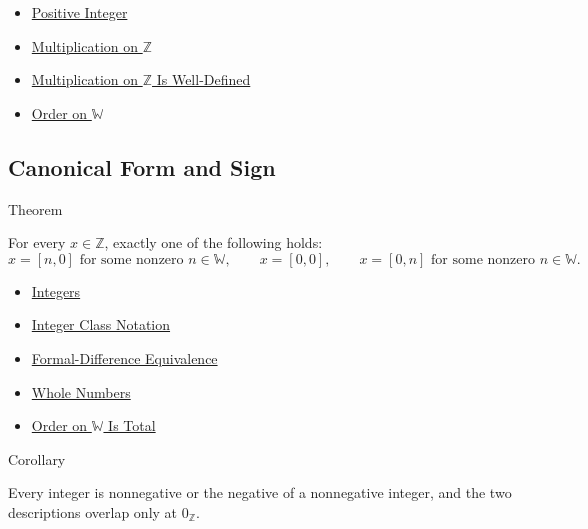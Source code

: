 \begin{dependencies}
\begin{itemize}
  \item \hyperref[def:positive-integer]{Positive Integer}
  \item \hyperref[def:multiplication-on-z-classes]{Multiplication on $\mathbb{Z}$}
  \item \hyperref[thm:multiplication-on-z-well-defined]{Multiplication on $\mathbb{Z}$ Is Well-Defined}
  \item \hyperref[def:order-on-w]{Order on $\mathbb{W}$}
\end{itemize}
\end{dependencies}

\subsection*{Canonical Form and Sign}

\begin{theorembox}{Theorem}
\begin{theorem}
\label{thm:canonical-form-of-integers}
For every $x\in\mathbb{Z}$, exactly one of the following holds:
\[
x=[n,0]\text{ for some nonzero }n\in\mathbb{W},\qquad
x=[0,0],\qquad
x=[0,n]\text{ for some nonzero }n\in\mathbb{W}.
\]
\end{theorem}
\end{theorembox}

\begin{dependencies}
\begin{itemize}
  \item \hyperref[def:integers]{Integers}
  \item \hyperref[def:integer-class-notation]{Integer Class Notation}
  \item \hyperref[def:formal-difference-equivalence]{Formal-Difference Equivalence}
  \item \hyperref[def:whole-numbers]{Whole Numbers}
  \item \hyperref[thm:order-on-w-total]{Order on $\mathbb{W}$ Is Total}
\end{itemize}
\end{dependencies}

\begin{corollarybox}{Corollary}
\begin{corollary}
\label{cor:integers-split-by-sign}
Every integer is nonnegative or the negative of a nonnegative integer, and
the two descriptions overlap only at $0_{\mathbb{Z}}$.
\end{corollary}
\end{corollarybox}

